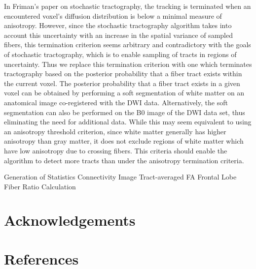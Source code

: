 \documentclass{article}
\begin{document}
In Friman's paper on stochastic tractography, the tracking is terminated when an encountered voxel's diffusion distribution is below a minimal measure of anisotropy.  However, since the stochastic tractography algorithm takes into account this uncertainty with an increase in the spatial variance of sampled fibers, this termination criterion seems arbitrary and contradictory with the goals of stochastic tractography, which is to enable sampling of tracts in regions of uncertainty.  Thus we replace this termination criterion with one which terminates tractography based on the posterior probability that a fiber tract exists within the current voxel.  The posterior probability that a fiber tract exists in a given voxel can be obtained by performing a soft segmentation of white matter on an anatomical image co-registered with the DWI data.  Alternatively, the soft segmentation can also be performed on the B0 image of the DWI data set, thus eliminating the need for additional data.  While this may seem equivalent to using an anisotropy threshold criterion, since white matter generally has higher anisotropy than gray matter, it does not exclude regions of white matter which have low anisotropy due to crossing fibers.  This criteria should enable the algorithm to detect more tracts than under the anisotropy termination criteria.

Generation of Statistics
  Connectivity Image
  Tract-averaged FA
  Frontal Lobe Fiber Ratio Calculation

\section{Acknowledgements}
\section{References}

\end{document}
